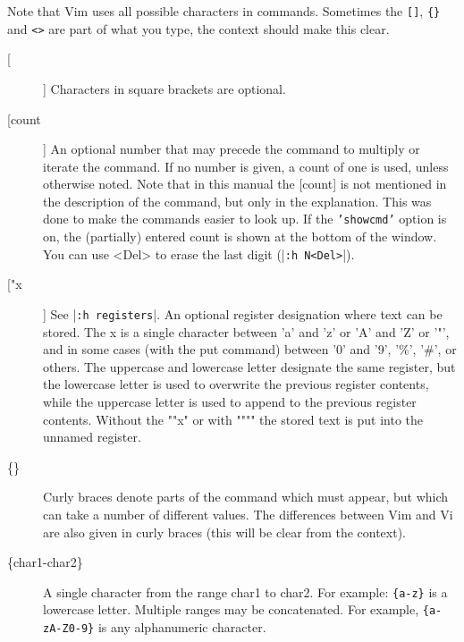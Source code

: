Note that Vim uses all possible characters in commands.
Sometimes the \texttt{[]}, \texttt{\{\}} and \texttt{<>} are part of what you type, the context should make this clear.

\begin{description}
				\item[[]]
								Characters in square brackets are optional.

				\item[[count]]
								\label{count} \label{[count]}
								An optional number that may precede the command to multiply or iterate the command.
								If no number is given, a count of one is used, unless otherwise noted.
								Note that in this manual the [count] is not mentioned in the description of the command, but only in the explanation.
								This was done to make the commands easier to look up.
								If the \texttt{'showcmd'} option is on, the (partially) entered count is shown at the bottom of the window.
								You can use <Del> to erase the last digit (|\texttt{:h N<Del>}|).

				\item[["x]]
								\label{[quotex]}
								See |\texttt{:h registers}|.
								An optional register designation where text can be stored.
								The x is a single character between 'a' and 'z' or 'A' and 'Z' or '"', and in some cases (with the put command) between '0' and '9', '\%', '\#', or others.
								The uppercase and lowercase letter designate the same register, but the lowercase letter is used to overwrite the previous register contents, while the uppercase letter is used to append to the previous register contents.
								Without the ""x" or with """" the stored text is put into the unnamed register.

				\item[\{\}]
								\label{{}}
								Curly braces denote parts of the command which must appear, but which can take a number of different values.
								The differences between Vim and Vi are also given in curly braces (this will be clear from the context).

				\item[\{char1-char2\}]
								\label{{char1-char2}}
								A single character from the range char1 to char2.
								For example: \texttt{\{a-z\}} is a lowercase letter.
								Multiple ranges may be concatenated.
								For example, \texttt{\{a-zA-Z0-9\}} is any alphanumeric character.


\end{description}
